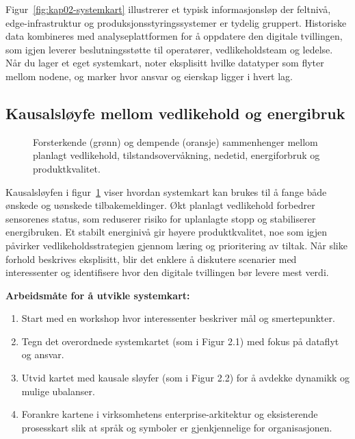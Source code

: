 Figur~\ref{fig:kap02-systemkart} illustrerer et typisk informasjonsløp der feltnivå, edge-infrastruktur og produksjonsstyringssystemer er tydelig gruppert. Historiske data kombineres med analyseplattformen for å oppdatere den digitale tvillingen, som igjen leverer beslutningsstøtte til operatører, vedlikeholdsteam og ledelse. Når du lager et eget systemkart, noter eksplisitt hvilke datatyper som flyter mellom nodene, og marker hvor ansvar og eierskap ligger i hvert lag.

\subsection{Kausalsløyfe mellom vedlikehold og energibruk}
\begin{figure}[ht]
    \centering
    \resizebox{0.92\textwidth}{!}{}
    \caption{Forsterkende (grønn) og dempende (oransje) sammenhenger mellom planlagt vedlikehold, tilstandsovervåkning, nedetid, energiforbruk og produktkvalitet.}
    \label{fig:kap02-kausal}
\end{figure}

Kausalsløyfen i figur~\ref{fig:kap02-kausal} viser hvordan systemkart kan brukes til å fange både ønskede og uønskede tilbakemeldinger. Økt planlagt vedlikehold forbedrer sensorenes status, som reduserer risiko for uplanlagte stopp og stabiliserer energibruken. Et stabilt energinivå gir høyere produktkvalitet, noe som igjen påvirker vedlikeholdsstrategien gjennom læring og prioritering av tiltak. Når slike forhold beskrives eksplisitt, blir det enklere å diskutere scenarier med interessenter og identifisere hvor den digitale tvillingen bør levere mest verdi.

\textbf{Arbeidsmåte for å utvikle systemkart:}
\begin{enumerate}
    \item Start med en workshop hvor interessenter beskriver mål og smertepunkter.
    \item Tegn det overordnede systemkartet (som i Figur 2.1) med fokus på dataflyt og ansvar.
    \item Utvid kartet med kausale sløyfer (som i Figur 2.2) for å avdekke dynamikk og mulige ubalanser.
    \item Forankre kartene i virksomhetens enterprise-arkitektur og eksisterende prosesskart slik at språk og symboler er gjenkjennelige for organisasjonen.
\end{enumerate}

